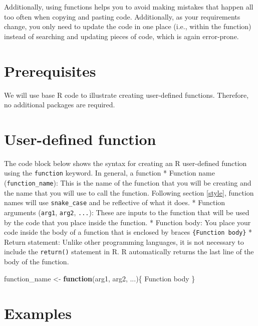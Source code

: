 \documentclass[
]{book}
\newenvironment{Shaded}{\begin{snugshade}}{\end{snugshade}}
\newcommand{\ControlFlowTok}[1]{\textcolor[rgb]{0.13,0.29,0.53}{\textbf{#1}}}
\newcommand{\NormalTok}[1]{#1}
\newcommand{\OtherTok}[1]{\textcolor[rgb]{0.56,0.35,0.01}{#1}}
\begin{document}
Additionally, using functions helps you to avoid making mistakes that happen all too often when copying and pasting code. Additionally, as your requirements change, you only need to update the code in one place (i.e., within the function) instead of searching and updating pieces of code, which is again error-prone.

\hypertarget{prerequisites-5}{%
\section{Prerequisites}\label{prerequisites-5}}

We will use base R code to illustrate creating user-defined functions. Therefore, no additional packages are required.

\hypertarget{user-defined-function}{%
\section{User-defined function}\label{user-defined-function}}

The code block below shows the syntax for creating an R user-defined function using the \texttt{function} keyword. In general, a function
* Function name (\texttt{function\_name}): This is the name of the function that you will be creating and the name that you will use to call the function. Following section \ref{style}, function names will use \texttt{snake\_case} and be reflective of what it does.
* Function arguments (\texttt{arg1}, \texttt{arg2}, \texttt{...}): These are inputs to the function that will be used by the code that you place inside the function.
* Function body: You place your code inside the body of a function that is enclosed by braces \texttt{\{Function\ body\}}
* Return statement: Unlike other programming languages, it is not necessary to include the \texttt{return()} statement in R. R automatically returns the last line of the body of the function.

\begin{Shaded}
\begin{Highlighting}[]
\NormalTok{function\_name }\OtherTok{\textless{}{-}} \ControlFlowTok{function}\NormalTok{(arg1, arg2, ...)\{}
\NormalTok{  Function body}
\NormalTok{\}}
\end{Highlighting}
\end{Shaded}

\hypertarget{examples}{%
\section{Examples}\label{examples}}
\end{document}
